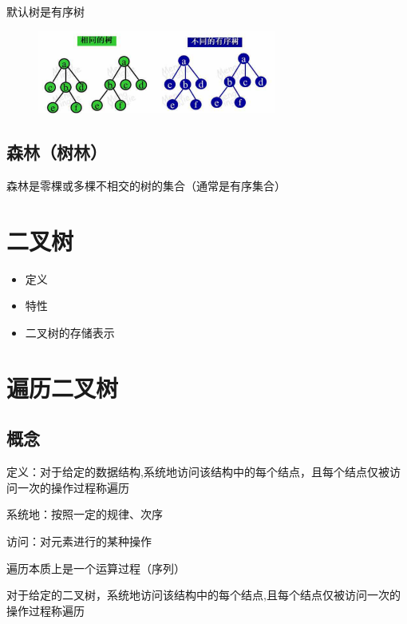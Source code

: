 \documentclass[AutoFakeBold]{LZUThesis2007}
\begin{document}
		默认树是有序树


\begin{figure}[H]
    \centering
    \includegraphics[width=0.7\textwidth]{figures/7.1.png}
    
    \label{fig_install_texlive}
\end{figure}

		\subsection{森林（树林）}
		森林是零棵或多棵不相交的树的集合（通常是有序集合）

	\section{二叉树}
		\begin{itemize}
			\item 定义
			\item 特性
			\item 二叉树的存储表示
		\end{itemize}

	\section{遍历二叉树}
		\subsection{概念}
		定义：对于给定的数据结构,系统地访问该结构中的每个结点，且每个结点仅被访问一次的操作过程称遍历

		系统地：按照一定的规律、次序

		访问：对元素进行的某种操作

		遍历本质上是一个运算过程（序列）

		对于给定的二叉树，系统地访问该结构中的每个结点,且每个结点仅被访问一次的操作过程称遍历
\end{document}
